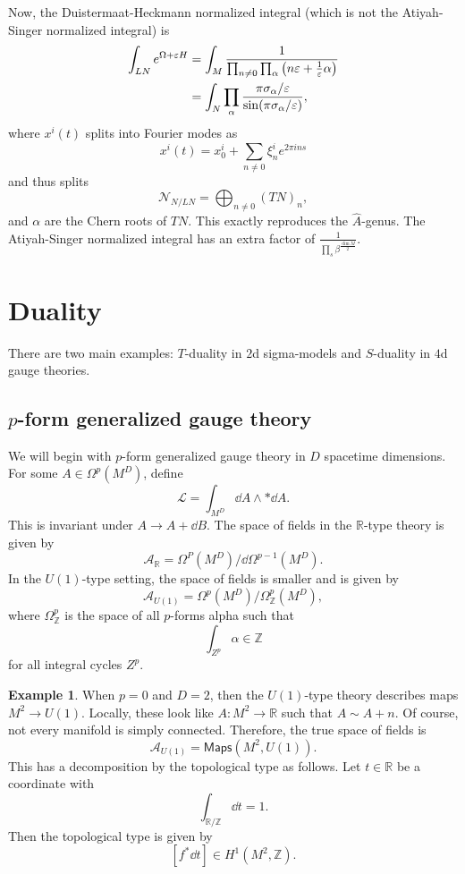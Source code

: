 \documentclass[leqno, openany]{memoir}
\theoremstyle{definition}
\newtheorem{exm}[thm]{Example}
\theoremstyle{remark}
\theoremstyle{plain}
\theoremstyle{definition}
\theoremstyle{remark}
\newcommand{\R}{\mathbb{R}}
\newcommand{\Z}{\mathbb{Z}}
\newcommand{\ep}{\varepsilon}
\newcommand{\mc}[1]{\mathcal{#1}}
\newcommand{\ms}[1]{\mathsf{#1}}
\begin{document}
Now, the Duistermaat-Heckmann normalized integral (which is not the Atiyah-Singer normalized integral) is
\begin{align*}
  \int_{LN} e^{\Omega + \ep H} &= \int_M \frac{1}{\prod_{n \neq 0} \prod_{\alpha} \qty(n \ep + \frac{1}{\ep}\alpha)} \\
  &= \int_N \prod_{\alpha} \frac{\pi \sigma_{\alpha}/\ep}{\sin(\pi \sigma_{\alpha}/\ep)},
\end{align*}
where $x^i(t)$ splits into Fourier modes as
\[ x^i(t) = x^i_0 + \sum_{n \neq 0} \xi_n^i e^{2\pi i n s} \]
and thus splits
\[ \mc{N}_{N/LN} = \bigoplus_{n \neq 0} (TN)_n, \]
and $\alpha$ are the Chern roots of $TN$. This exactly reproduces the $\hat{A}$-genus.
The Atiyah-Singer normalized integral has an extra factor of $\frac{1}{\prod_s \beta^{\frac{\dim M}{2}}}$.

\section{Duality}%
\label{cha:duality}

There are two main examples: $T$-duality in $2$d sigma-models and $S$-duality in $4$d gauge theories.

\subsection{$p$-form generalized gauge theory}

We will begin with $p$-form generalized gauge theory in $D$ spacetime dimensions. For some $A \in \Omega^p(M^D)$, define
\[ \mc{L} = \int_{M^D} \dd{A} \wedge * \dd{A}. \]
This is invariant under $A \to A + \dd{B}$. The space of fields in the $\R$-type theory is given by
\[ \mc{A}_{\R} = \Omega^P(M^D) / \dd{\Omega^{p-1}(M^D)}. \]
In the $U(1)$-type setting, the space of fields is smaller and is given by
\[ \mc{A}_{U(1)} = \Omega^p(M^D) / \Omega^p_{\Z}(M^D), \]
where $\Omega^p_{\Z}$ is the space of all $p$-forms alpha such that 
\[ \int_{Z^p} \alpha \in \Z \]
for all integral cycles $Z^p$.

\begin{exm}
    When $p=0$ and $D = 2$, then the $U(1)$-type theory describes maps $M^2 \to U(1)$. Locally, these look like $A \colon M^2 \to \R$ such that $A \sim A + n$. Of course, not every manifold is simply connected. Therefore, the true space of fields is
    \[ \mc{A}_{U(1)} = \ms{Maps}(M^2, U(1)). \]
    This has a decomposition by the topological type as follows. Let $t \in \R$ be a coordinate with
    \[ \int_{\R/\Z} \dd{t} = 1. \]
    Then the topological type is given by
    \[ [f^* \dd{t}] \in H^1(M^2, \Z). \]
\end{exm}
\end{document}
